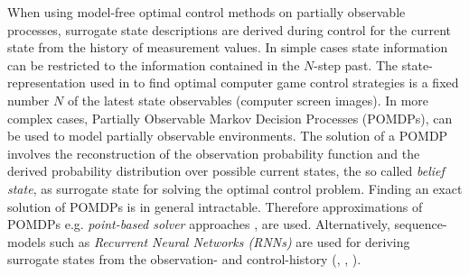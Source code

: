 When using model-free optimal control methods on partially observable processes, surrogate state descriptions are derived during control for the current state from the history of measurement values. In simple cases state information can be restricted to the information contained in the $N$-step past. The state-representation used in \cite{mnih2015human} to find optimal computer game control strategies is a fixed number $N$ of the latest state observables (computer screen images). In more complex cases, Partially Observable Markov Decision Processes (POMDPs), can be used to model partially observable environments. The solution of a POMDP involves the reconstruction of the observation probability function and the derived probability distribution over possible current states, the so called \textit{belief state}, as surrogate state for solving the optimal control problem. Finding an exact solution of POMDPs is in general intractable. Therefore approximations of POMDPs  e.g. \textit{point-based solver} approaches \cite{Shani2013}, are used. Alternatively, sequence-models such as \textit{Recurrent Neural Networks (RNNs)} are used for deriving surrogate states from the observation- and control-history (\cite{lin1993reinforcement}, \cite{Bakker2002}, \cite{Shani2013}). 


\begin{comment}
If the considered system $f$ is partially observable, the state $x$ is not directly accessible when solving eq. (\ref{bellman_v}), instead a vector of measured values $o$ is given in every control-step.
\begin{equation}
o=g(x)+z
\end{equation}
where $z$ is a vector of measurement noise and $g$ is a potentially non-linear vector-valued function.


Partially Observable Markov Decision Processes\linebreak(POMDP) are generalized MDPs described by the 7-tuple $(X,\allowbreak U,\allowbreak P,\allowbreak R,\allowbreak \Omega,\allowbreak O,\allowbreak \gamma)$ where $(X, U, P, R, \gamma)$ equals the underlying MDP. In POMDPs observables $o\in\Omega$ are given to the agent instead of the state $x$. The observable values $o$ follow the observation probability function $O(o|x,u)$. The Markov Property does not necessarily hold for POMDPs observables and the optimal policy is therefore potentially dependent on the entire history of observations and actions. Surrogate states can be introduced and calculated from past observations and actions, which are again subject to a MDP and can be used to derive an optimal policy \cite{Kaelbling1998}.
\end{comment}

